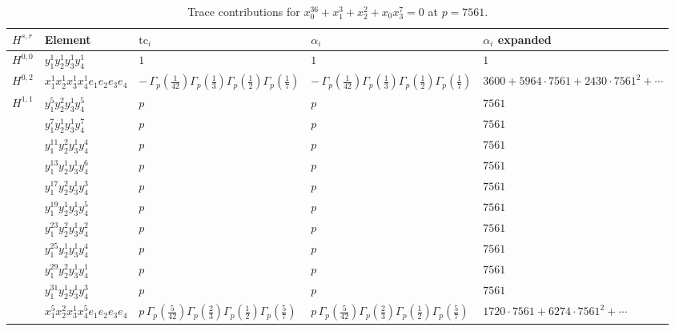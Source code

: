 \documentclass[11pt]{article}
\begin{document}
\begin{table}[ht]
\centering
\caption{Trace contributions for $x_0^{36} + x_1^{3} + x_2^{2} + x_0 x_3^{7} = 0$ at $p=7561$.}\label{tab:deformed-76}
\renewcommand{\arraystretch}{1.1}
{\scriptsize
\begin{tabular}{@{}lllll@{}}
\toprule
$H^{s,r}$ & Element & $\mathrm{tc}_i$ & $\alpha_i$ & $\alpha_i$ expanded \\
\midrule
$H^{0,0}$ & $y_{1}^{1} y_{2}^{1} y_{3}^{1} y_{4}^{1}$ & $1$ & $1$ & $1$ \\
\midrule
$H^{0,2}$ & $x_{1}^{1} x_{2}^{1} x_{3}^{1} x_{4}^{1}  e_{1} e_{2} e_{3} e_{4}$ & $- \, \Gamma_p \left( \frac{1}{42} \right) \Gamma_p \left( \frac{1}{3} \right) \Gamma_p \left( \frac{1}{2} \right) \Gamma_p \left( \frac{1}{7} \right)$ & $- \, \Gamma_p \left( \frac{1}{42} \right) \Gamma_p \left( \frac{1}{3} \right) \Gamma_p \left( \frac{1}{2} \right) \Gamma_p \left( \frac{1}{7} \right)$ & $3600{+}5964{\cdot}7561{+}2430{\cdot}7561^{2}{+}\cdots$ \\
\midrule
$H^{1,1}$ & $y_{1}^{5} y_{2}^{2} y_{3}^{1} y_{4}^{5}$ & $p \,$ & $p \,$ & $7561$ \\
 & $y_{1}^{7} y_{2}^{1} y_{3}^{1} y_{4}^{7}$ & $p \,$ & $p \,$ & $7561$ \\
 & $y_{1}^{11} y_{2}^{2} y_{3}^{1} y_{4}^{4}$ & $p \,$ & $p \,$ & $7561$ \\
 & $y_{1}^{13} y_{2}^{1} y_{3}^{1} y_{4}^{6}$ & $p \,$ & $p \,$ & $7561$ \\
 & $y_{1}^{17} y_{2}^{2} y_{3}^{1} y_{4}^{3}$ & $p \,$ & $p \,$ & $7561$ \\
 & $y_{1}^{19} y_{2}^{1} y_{3}^{1} y_{4}^{5}$ & $p \,$ & $p \,$ & $7561$ \\
 & $y_{1}^{23} y_{2}^{2} y_{3}^{1} y_{4}^{2}$ & $p \,$ & $p \,$ & $7561$ \\
 & $y_{1}^{25} y_{2}^{1} y_{3}^{1} y_{4}^{4}$ & $p \,$ & $p \,$ & $7561$ \\
 & $y_{1}^{29} y_{2}^{2} y_{3}^{1} y_{4}^{1}$ & $p \,$ & $p \,$ & $7561$ \\
 & $y_{1}^{31} y_{2}^{1} y_{3}^{1} y_{4}^{3}$ & $p \,$ & $p \,$ & $7561$ \\
 & $x_{1}^{5} x_{2}^{2} x_{3}^{1} x_{4}^{5}  e_{1} e_{2} e_{3} e_{4}$ & $p \, \Gamma_p \left( \frac{5}{42} \right) \Gamma_p \left( \frac{2}{3} \right) \Gamma_p \left( \frac{1}{2} \right) \Gamma_p \left( \frac{5}{7} \right)$ & $p \, \Gamma_p \left( \frac{5}{42} \right) \Gamma_p \left( \frac{2}{3} \right) \Gamma_p \left( \frac{1}{2} \right) \Gamma_p \left( \frac{5}{7} \right)$ & $1720{\cdot}7561{+}6274{\cdot}7561^{2}{+}\cdots$ \\

\end{tabular}}
\end{table}
\end{document}
